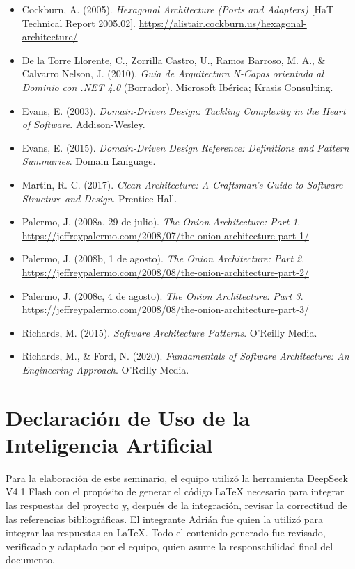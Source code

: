 \documentclass[12pt,a4paper]{article}
\begin{document}
\begin{itemize}[label={},leftmargin=0pt,itemsep=0.45em]
  \item Cockburn, A. (2005). \emph{Hexagonal Architecture (Ports and Adapters)} [HaT Technical Report 2005.02]. \url{https://alistair.cockburn.us/hexagonal-architecture/}
  \item De la Torre Llorente, C., Zorrilla Castro, U., Ramos Barroso, M. A., \& Calvarro Nelson, J. (2010). \emph{Guía de Arquitectura N-Capas orientada al Dominio con .NET 4.0} (Borrador). Microsoft Ibérica; Krasis Consulting.
  \item Evans, E. (2003). \emph{Domain-Driven Design: Tackling Complexity in the Heart of Software}. Addison-Wesley.
  \item Evans, E. (2015). \emph{Domain-Driven Design Reference: Definitions and Pattern Summaries}. Domain Language.
  \item Martin, R. C. (2017). \emph{Clean Architecture: A Craftsman's Guide to Software Structure and Design}. Prentice Hall.
  \item Palermo, J. (2008a, 29 de julio). \emph{The Onion Architecture: Part 1}. \url{https://jeffreypalermo.com/2008/07/the-onion-architecture-part-1/}
  \item Palermo, J. (2008b, 1 de agosto). \emph{The Onion Architecture: Part 2}. \url{https://jeffreypalermo.com/2008/08/the-onion-architecture-part-2/}
  \item Palermo, J. (2008c, 4 de agosto). \emph{The Onion Architecture: Part 3}. \url{https://jeffreypalermo.com/2008/08/the-onion-architecture-part-3/}
  \item Richards, M. (2015). \emph{Software Architecture Patterns}. O'Reilly Media.
  \item Richards, M., \& Ford, N. (2020). \emph{Fundamentals of Software Architecture: An Engineering Approach}. O'Reilly Media.
\end{itemize}

\section*{Declaración de Uso de la Inteligencia Artificial}

Para la elaboración de este seminario, el equipo utilizó la herramienta DeepSeek V4.1 Flash con el propósito de generar el código LaTeX necesario para integrar las respuestas del proyecto y, después de la integración, revisar la correctitud de las referencias bibliográficas. El integrante Adrián fue quien la utilizó para integrar las respuestas en LaTeX. Todo el contenido generado fue revisado, verificado y adaptado por el equipo, quien asume la responsabilidad final del documento.
\end{document}
